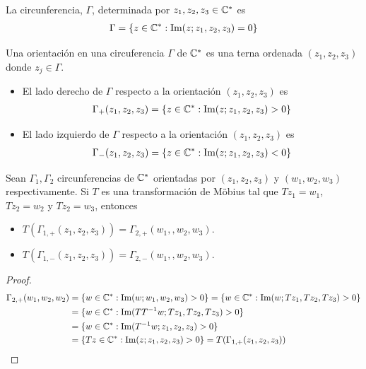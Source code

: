 \begin{obs}
    La circunferencia, $\Gamma$, determinada por $z_1,z_2,z_3 \in \mathbb{C}^*$ es
    \begin{align*}
        \Gamma = \{ z \in \mathbb{C}^* : \text{Im}(z;z_1,z_2,z_3) = 0 \}
    \end{align*}
\end{obs}

\begin{defi}
    Una orientación en una circuferencia $\Gamma$ de $\mathbb{C}^*$ es una terna ordenada $(z_1,z_2,z_3)$ donde $z_j \in \Gamma$.
    \begin{itemize}
        \item El lado derecho de $\Gamma$ respecto a la orientación $(z_1,z_2,z_3)$ es
              \begin{align*}
                  \Gamma_+(z_1,z_2,z_3) = \{ z \in \mathbb{C}^* : \text{Im}(z;z_1,z_2,z_3) > 0 \}
              \end{align*}
        \item El lado izquierdo de $\Gamma$ respecto a la orientación $(z_1,z_2,z_3)$ es
              \begin{align*}
                  \Gamma_-(z_1,z_2,z_3) = \{ z \in \mathbb{C}^* : \text{Im}(z;z_1,z_2,z_3) < 0 \}
              \end{align*}
    \end{itemize}
\end{defi}

\begin{prop}
    Sean $\Gamma_1,\Gamma_2$ circunferencias de $\mathbb{C}^*$ orientadas por $(z_1,z_2,z_3)$ y $(w_1,w_2,w_3)$ respectivamente. Si $T$ es una transformación de M\"obius tal que $Tz_1 = w_1$, $Tz_2 = w_2$ y $Tz_2 = w_3$, entonces
    \begin{itemize}
        \item $T(\Gamma_{1, +}(z_1,z_2,z_3)) = \Gamma_{2,+}(w_1,,w_2,w_3)$.
        \item $T(\Gamma_{1, -}(z_1,z_2,z_3)) = \Gamma_{2,-}(w_1,,w_2,w_3)$.
    \end{itemize}
\end{prop}

\begin{proof}
    \begin{align*}
        \Gamma_{2,+}(w_1,w_2,w_2) & = \{ w \in \mathbb{C}^* : \text{Im}(w;w_1,w_2,w_3) > 0\} = \{ w \in \mathbb{C}^* : \text{Im}(w;Tz_1,Tz_2,Tz_3) > 0\} \\
                                  & = \{ w \in \mathbb{C}^* : \text{Im}(TT^{-1}w;Tz_1,Tz_2,Tz_3) > 0\}                                       \\
                                  & = \{ w \in \mathbb{C}^* : \text{Im}(T^{-1}w;z_1,z_2,z_3) > 0\}                                           \\
                                  & = \{Tz \in \mathbb{C}^* : \text{Im}(z;z_1,z_2,z_3) > 0 \} = T(\Gamma_{1,+}(z_1,z_2,z_3))
    \end{align*}
\end{proof}


